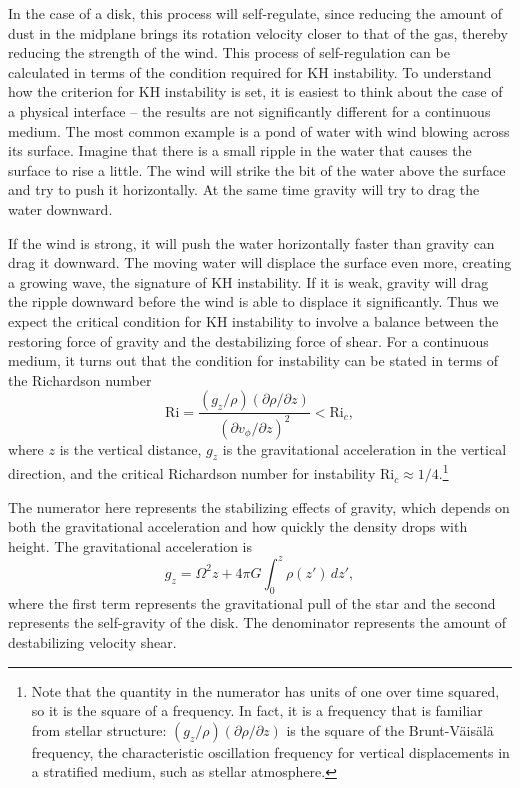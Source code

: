 In the case of a disk, this process will self-regulate, since reducing the amount of dust in the midplane brings its rotation velocity closer to that of the gas, thereby reducing the strength of the wind. This process of self-regulation can be calculated in terms of the condition required for KH instability. To understand how the criterion for KH instability is set, it is easiest to think about the case of a physical interface -- the results are not significantly different for a continuous medium. The most common example is a pond of water with wind blowing across its surface. Imagine that there is a small ripple in the water that causes the surface to rise a little. The wind will strike the bit of the water above the surface and try to push it horizontally. At the same time gravity will try to drag the water downward.

If the wind is strong, it will push the water horizontally faster than gravity can drag it downward. The moving water will displace the surface even more, creating a growing wave, the signature of KH instability. If it is weak, gravity will drag the ripple downward before the wind is able to displace it significantly. Thus we expect the critical condition for KH instability to involve a balance between the restoring force of gravity and the destabilizing force of shear. For a continuous medium, it turns out that the condition for instability can be stated in terms of the Richardson number
\begin{equation}
\mbox{Ri} = \frac{(g_z/\rho) (\partial \rho/\partial z)}{\left(\partial v_\phi/\partial z\right)^2} < \mbox{Ri}_c,
\end{equation}
where $z$ is the vertical distance, $g_z$ is the gravitational acceleration in the vertical direction, and the critical Richardson number for instability $\mbox{Ri}_c\approx 1/4$.\footnote{Note that the quantity in the numerator has units of one over time squared, so it is the square of a frequency. In fact, it is a frequency that is familiar from stellar structure: $(g_z/\rho) (\partial \rho/\partial z)$ is the square of the Brunt-V\"{a}is\"{a}l\"{a} frequency, the characteristic oscillation frequency for vertical displacements in a stratified medium, such as stellar atmosphere.}

The numerator here represents the stabilizing effects of gravity, which depends on both the gravitational acceleration and how quickly the density drops with height. The gravitational acceleration is
\begin{equation}
g_z = \Omega^2 z + 4\pi G \int_0^z \rho(z') \, dz',
\end{equation}
where the first term represents the gravitational pull of the star and the second represents the self-gravity of the disk. The denominator represents the amount of destabilizing velocity shear.

